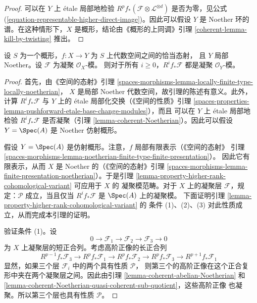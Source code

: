 \begin{proof}
可以在 $Y$ 上 \'etale 局部地检验
$R^pf_*(\mathcal{F} \otimes \mathcal{L}^{\otimes d})$ 是否为零，见公式
(\ref{equation-representable-higher-direct-image})。因此可以假设 $Y$ 是
Noether 环的谱。在这种情形下，$X$ 是概形，结论由《概形的上同调》引理
\ref{coherent-lemma-kill-by-twisting} 推出。
\end{proof}

\begin{lemma}
\label{lemma-proper-pushforward-coherent}
设 $S$ 为一个概形，$f : X \to Y$ 为 $S$ 上代数空间之间的恰当态射，
且 $Y$ 局部 Noether。设 $\mathcal{F}$ 为凝聚 $\mathcal{O}_X$-模。
则对于所有 $i \geq 0$，$R^if_*\mathcal{F}$ 都是凝聚
$\mathcal{O}_Y$-模。
\end{lemma}

\begin{proof}
首先，由《空间的态射》引理
\ref{spaces-morphisms-lemma-locally-finite-type-locally-noetherian}，
$X$ 是局部 Noether 代数空间，故引理的陈述有意义。此外，计算
$R^if_*\mathcal{F}$ 与 $Y$ 上的 \'etale 局部化交换（《空间的性质》引理
\ref{spaces-properties-lemma-pushforward-etale-base-change-modules}），而且
可以在 $Y$ 上 \'etale 局部地检验 $R^if_*\mathcal{F}$ 是否凝聚（引理
\ref{lemma-coherent-Noetherian}）。因此可以假设
$Y = \Spec(A)$ 是 Noether 仿射概形。

\medskip\noindent
假设 $Y = \Spec(A)$ 是仿射概形。注意，$f$ 局部有限表示（《空间的态射》
引理 \ref{spaces-morphisms-lemma-noetherian-finite-type-finite-presentation}）。
因此它有限表示，从而 $X$ 是 Noether 的（《空间的态射》引理
\ref{spaces-morphisms-lemma-finite-presentation-noetherian}）。于是引理
\ref{lemma-property-higher-rank-cohomological-variant} 可应用于 $X$ 的
凝聚模范畴。对于 $X$ 上的凝聚层 $\mathcal{F}$，规定：$\mathcal{P}$
成立，当且仅当 $R^if_*\mathcal{F}$ 是 $\Spec(A)$ 上的凝聚模。
下面证明引理 \ref{lemma-property-higher-rank-cohomological-variant} 的
条件 (1)、(2)、(3) 对此性质成立，从而完成本引理的证明。

\medskip\noindent
验证条件 (1)。设
$$
0 \to \mathcal{F}_1 \to \mathcal{F}_2 \to \mathcal{F}_3 \to 0
$$
为 $X$ 上凝聚层的短正合列。考虑高阶正像的长正合列
$$
R^{p - 1}f_*\mathcal{F}_3 \to
R^pf_*\mathcal{F}_1 \to
R^pf_*\mathcal{F}_2 \to
R^pf_*\mathcal{F}_3 \to
R^{p + 1}f_*\mathcal{F}_1
$$
显然，如果三个层 $\mathcal{F}_i$ 中的两个具有性质 $\mathcal{P}$，
则第三个的高阶正像在这个正合复形中夹在两个凝聚层之间。因此由引理
\ref{lemma-coherent-abelian-Noetherian} 和
\ref{lemma-coherent-Noetherian-quasi-coherent-sub-quotient}，这些高阶正像
也凝聚。所以第三个层也具有性质 $\mathcal{P}$。


\end{proof}

